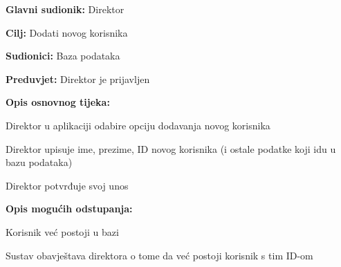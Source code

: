 			\noindent {}
			\begin{packed_item}
				
				\item \textbf{Glavni sudionik: } Direktor
				\item  \textbf{Cilj:} Dodati novog korisnika
				\item  \textbf{Sudionici:} Baza podataka
				\item  \textbf{Preduvjet:} Direktor je prijavljen
				\item  \textbf{Opis osnovnog tijeka:}
				
				\item[] \begin{packed_enum}
					
					\item Direktor u aplikaciji odabire opciju dodavanja novog korisnika
					\item Direktor upisuje ime, prezime, ID novog korisnika (i ostale podatke koji idu u bazu podataka)
					\item Direktor potvrđuje svoj unos
				\end{packed_enum}
				
				\item  \textbf{Opis mogućih odstupanja:}
				
				\item[] \begin{packed_item}
					
					\item[2.a] Korisnik već postoji u bazi
					\item[] \begin{packed_enum}
						
						\item Sustav obavještava direktora o tome da već postoji korisnik s tim ID-om
						
					\end{packed_enum}
					
				\end{packed_item}
			\end{packed_item}
			
